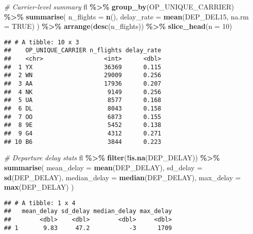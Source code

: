 \documentclass[
]{article}
\newenvironment{Shaded}{\begin{snugshade}}{\end{snugshade}}
\newcommand{\AttributeTok}[1]{\textcolor[rgb]{0.13,0.29,0.53}{#1}}
\newcommand{\CommentTok}[1]{\textcolor[rgb]{0.56,0.35,0.01}{\textit{#1}}}
\newcommand{\ConstantTok}[1]{\textcolor[rgb]{0.56,0.35,0.01}{#1}}
\newcommand{\DecValTok}[1]{\textcolor[rgb]{0.00,0.00,0.81}{#1}}
\newcommand{\FunctionTok}[1]{\textcolor[rgb]{0.13,0.29,0.53}{\textbf{#1}}}
\newcommand{\NormalTok}[1]{#1}
\newcommand{\SpecialCharTok}[1]{\textcolor[rgb]{0.81,0.36,0.00}{\textbf{#1}}}
\begin{document}
\begin{Shaded}
\begin{Highlighting}[]
\CommentTok{\# Carrier‑level summary }
\NormalTok{fl }\SpecialCharTok{\%\textgreater{}\%}
  \FunctionTok{group\_by}\NormalTok{(OP\_UNIQUE\_CARRIER) }\SpecialCharTok{\%\textgreater{}\%}
  \FunctionTok{summarise}\NormalTok{(}
    \AttributeTok{n\_flights  =} \FunctionTok{n}\NormalTok{(),}
    \AttributeTok{delay\_rate =} \FunctionTok{mean}\NormalTok{(DEP\_DEL15, }\AttributeTok{na.rm =} \ConstantTok{TRUE}\NormalTok{)}
\NormalTok{  ) }\SpecialCharTok{\%\textgreater{}\%}
  \FunctionTok{arrange}\NormalTok{(}\FunctionTok{desc}\NormalTok{(n\_flights)) }\SpecialCharTok{\%\textgreater{}\%}
  \FunctionTok{slice\_head}\NormalTok{(}\AttributeTok{n =} \DecValTok{10}\NormalTok{)}
\end{Highlighting}
\end{Shaded}

\begin{verbatim}
## # A tibble: 10 x 3
##    OP_UNIQUE_CARRIER n_flights delay_rate
##    <chr>                 <int>      <dbl>
##  1 YX                    36369      0.115
##  2 WN                    29009      0.256
##  3 AA                    17936      0.207
##  4 NK                     9149      0.256
##  5 UA                     8577      0.168
##  6 DL                     8043      0.158
##  7 OO                     6873      0.155
##  8 9E                     5452      0.138
##  9 G4                     4312      0.271
## 10 B6                     3844      0.223
\end{verbatim}

\begin{Shaded}
\begin{Highlighting}[]
\CommentTok{\# Departure delay stats }
\NormalTok{fl }\SpecialCharTok{\%\textgreater{}\%}
  \FunctionTok{filter}\NormalTok{(}\SpecialCharTok{!}\FunctionTok{is.na}\NormalTok{(DEP\_DELAY)) }\SpecialCharTok{\%\textgreater{}\%}
  \FunctionTok{summarise}\NormalTok{(}
    \AttributeTok{mean\_delay   =} \FunctionTok{mean}\NormalTok{(DEP\_DELAY),}
    \AttributeTok{sd\_delay     =} \FunctionTok{sd}\NormalTok{(DEP\_DELAY),}
    \AttributeTok{median\_delay =} \FunctionTok{median}\NormalTok{(DEP\_DELAY),}
    \AttributeTok{max\_delay    =} \FunctionTok{max}\NormalTok{(DEP\_DELAY)}
\NormalTok{  )}
\end{Highlighting}
\end{Shaded}

\begin{verbatim}
## # A tibble: 1 x 4
##   mean_delay sd_delay median_delay max_delay
##        <dbl>    <dbl>        <dbl>     <dbl>
## 1       9.83     47.2           -3      1709
\end{verbatim}
\end{document}

